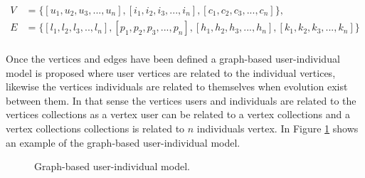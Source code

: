\begin{equation*}\label{eq:graphRelDef} 
\displaystyle 
\begin{split} 
V &= \{[u_1,u_2,u_3,...,u_n],[i_1,i_2,i_3,...,i_n],[c_1,c_2,c_3,...,c_n]\},\\ 
E&= \{[l_1,l_2,l_3,..,l_n],[p_1,p_2,p_3,...,p_n],[h_1,h_2,h_3,...,h_n],[k_1,k_2,k_3,...,k_n]\}\\ 
\end{split} 
\end{equation*} 

Once  the vertices and edges have been defined a graph-based user-individual model is
proposed where  user vertices are related to the individual vertices, likewise
the vertices individuals are related to themselves when evolution exist between
them. %
In that sense the vertices users and individuals are related to the
vertices collections as a vertex user can be related to a vertex collections and
a vertex collections collections is related to $n$ individuals vertex. In Figure
\ref{fig:user_moder} shows an example of the graph-based user-individual model.

\begin{figure}
\captionsetup{justification=centering,margin=2cm}
\centering
\setlength\fboxsep{0pt}
\setlength\fboxrule{0.7pt}
\caption{Graph-based user-individual model.}
\label{fig:user_moder}       
\end{figure}
